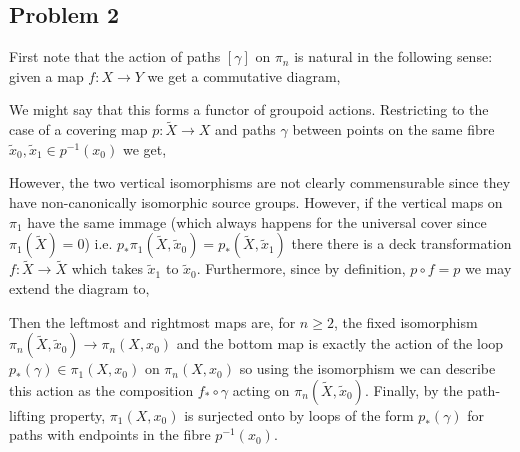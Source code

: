 \documentclass[12pt]{extarticle}
\begin{document}
\subsection{Problem 2}

First note that the action of paths $[\gamma]$ on $\pi_n$ is natural in the following sense: given a map $f : X \to Y$ we get a commutative diagram,
\begin{center}
\end{center}
We might say that this forms a functor of groupoid actions. Restricting to the case of a covering map $p : \tilde{X} \to X$ and paths $\gamma$ between points on the same fibre $\tilde{x}_0, \tilde{x}_1 \in p^{-1}(x_0)$ we get,
\begin{center}
\end{center}
However, the two vertical isomorphisms are not clearly commensurable since they have non-canonically isomorphic source groups. However, if the vertical maps on $\pi_1$ have the same immage (which always happens for the universal cover since $\pi_1(\tilde{X}) = 0$) i.e. $p_* \pi_1(\tilde{X}, \tilde{x}_0) = p_*(\tilde{X}, \tilde{x}_1)$ there there is a deck transformation $f : \tilde{X} \to \tilde{X}$ which takes $\tilde{x}_1$ to $\tilde{x}_0$. Furthermore, since by definition, $p \circ f = p$ we may extend the diagram to,
\begin{center}
\end{center}
Then the leftmost and rightmost maps are, for $n \ge 2$, the fixed isomorphism $\pi_n(\tilde{X}, \tilde{x}_0) \to \pi_n(X, x_0)$ and the bottom map is exactly the action of the loop $p_*(\gamma) \in \pi_1(X, x_0)$ on $\pi_n(X, x_0)$ so using the isomorphism we can describe this action as the composition $f_* \circ \gamma$ acting on $\pi_n(\tilde{X}, \tilde{x}_0)$. Finally, by the path-lifting property, $\pi_1(X, x_0)$ is surjected onto by loops of the form $p_*(\gamma)$ for paths with endpoints in the fibre $p^{-1}(x_0)$.
\end{document}
